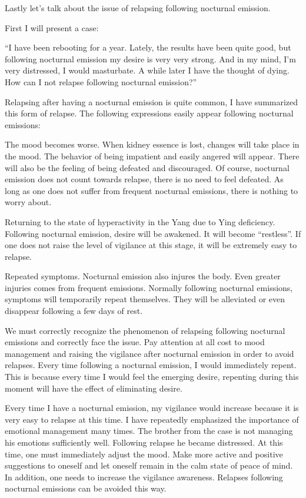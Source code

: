 \documentclass[
]{book}
\begin{document}
Lastly let's talk about the issue of relapsing following nocturnal emission.

First I will present a case:

``I have been rebooting for a year. Lately, the results have been quite good, but following nocturnal emission my desire is very very strong. And in my mind, I'm very distressed, I would masturbate. A while later I have the thought of dying. How can I not relapse following nocturnal emission?''

Relapsing after having a nocturnal emission is quite common, I have summarized this form of relapse. The following expressions easily appear following nocturnal emissions:

The mood becomes worse. When kidney essence is lost, changes will take place in the mood. The behavior of being impatient and easily angered will appear. There will also be the feeling of being defeated and discouraged. Of course, nocturnal emission does not count towards relapse, there is no need to feel defeated. As long as one does not suffer from frequent nocturnal emissions, there is nothing to worry about.

Returning to the state of hyperactivity in the Yang due to Ying deficiency. Following nocturnal emission, desire will be awakened. It will become ``restless''. If one does not raise the level of vigilance at this stage, it will be extremely easy to relapse.

Repeated symptoms. Nocturnal emission also injures the body. Even greater injuries comes from frequent emissions. Normally following nocturnal emissions, symptoms will temporarily repeat themselves. They will be alleviated or even disappear following a few days of rest.

We must correctly recognize the phenomenon of relapsing following nocturnal emissions and correctly face the issue. Pay attention at all cost to mood management and raising the vigilance after nocturnal emission in order to avoid relapses. Every time following a nocturnal emission, I would immediately repent. This is because every time I would feel the emerging desire, repenting during this moment will have the effect of eliminating desire.

Every time I have a nocturnal emission, my vigilance would increase because it is very easy to relapse at this time. I have repeatedly emphasized the importance of emotional management many times. The brother from the case is not managing his emotions sufficiently well. Following relapse he became distressed. At this time, one must immediately adjust the mood. Make more active and positive suggestions to oneself and let oneself remain in the calm state of peace of mind. In addition, one needs to increase the vigilance awareness. Relapses following nocturnal emissions can be avoided this way.
\end{document}
